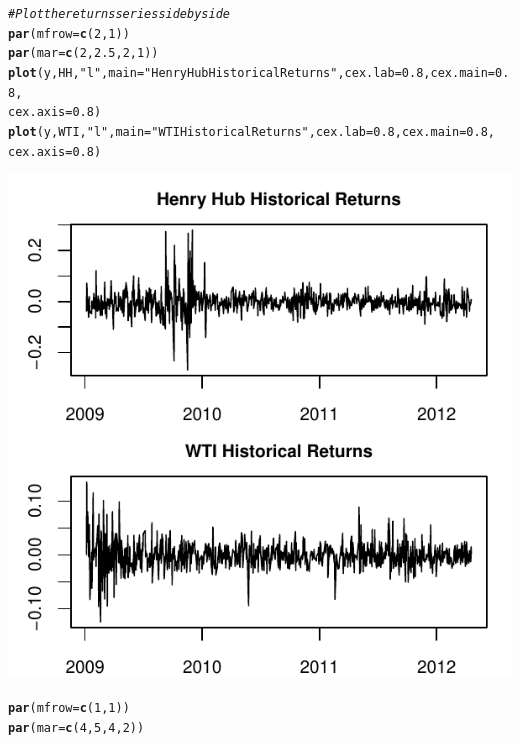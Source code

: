 \documentclass[10pt]{article}\usepackage[]{graphicx}\usepackage[]{color}
\makeatletter
\def\maxwidth{ %
  \ifdim\Gin@nat@width>\linewidth
    \linewidth
  \else
    \Gin@nat@width
  \fi
}
\newcommand{\hlnum}[1]{\textcolor[rgb]{0.686,0.059,0.569}{#1}}%
\newcommand{\hlstr}[1]{\textcolor[rgb]{0.192,0.494,0.8}{#1}}%
\newcommand{\hlcom}[1]{\textcolor[rgb]{0.678,0.584,0.686}{\textit{#1}}}%
\newcommand{\hlstd}[1]{\textcolor[rgb]{0.345,0.345,0.345}{#1}}%
\newcommand{\hlkwc}[1]{\textcolor[rgb]{0.333,0.667,0.333}{#1}}%
\newcommand{\hlkwd}[1]{\textcolor[rgb]{0.737,0.353,0.396}{\textbf{#1}}}%
\newenvironment{kframe}{%
 \def\at@end@of@kframe{}%
 \ifinner\ifhmode%
  \def\at@end@of@kframe{\end{minipage}}%
  \begin{minipage}{\columnwidth}%
 \fi\fi%
 \def\FrameCommand##1{\hskip\@totalleftmargin \hskip-\fboxsep
 \colorbox{shadecolor}{##1}\hskip-\fboxsep
     \hskip-\linewidth \hskip-\@totalleftmargin \hskip\columnwidth}%
 \MakeFramed {\advance\hsize-\width
   \@totalleftmargin\z@ \linewidth\hsize
   \@setminipage}}%
 {\par\unskip\endMakeFramed%
 \at@end@of@kframe}
\newenvironment{knitrout}{}{} %
\makeatother
\begin{document}
\begin{knitrout}
\color{fgcolor}\begin{kframe}
\begin{alltt}
\hlcom{# Plot the returns series side by side}
\hlkwd{par}\hlstd{(}\hlkwc{mfrow} \hlstd{=} \hlkwd{c}\hlstd{(}\hlnum{2}\hlstd{,} \hlnum{1}\hlstd{))}
\hlkwd{par}\hlstd{(}\hlkwc{mar} \hlstd{=} \hlkwd{c}\hlstd{(}\hlnum{2}\hlstd{,} \hlnum{2.5}\hlstd{,} \hlnum{2}\hlstd{,} \hlnum{1}\hlstd{))}
\hlkwd{plot}\hlstd{(y, HH,} \hlstr{"l"}\hlstd{,} \hlkwc{main} \hlstd{=} \hlstr{"Henry Hub Historical Returns"}\hlstd{,} \hlkwc{cex.lab} \hlstd{=} \hlnum{0.8}\hlstd{,} \hlkwc{cex.main} \hlstd{=} \hlnum{0.8}\hlstd{,}
    \hlkwc{cex.axis} \hlstd{=} \hlnum{0.8}\hlstd{)}
\hlkwd{plot}\hlstd{(y, WTI,} \hlstr{"l"}\hlstd{,} \hlkwc{main} \hlstd{=} \hlstr{"WTI Historical Returns"}\hlstd{,} \hlkwc{cex.lab} \hlstd{=} \hlnum{0.8}\hlstd{,} \hlkwc{cex.main} \hlstd{=} \hlnum{0.8}\hlstd{,}
    \hlkwc{cex.axis} \hlstd{=} \hlnum{0.8}\hlstd{)}
\end{alltt}
\end{kframe}

{\centering \includegraphics[width=\maxwidth]{figure/unnamed-chunk-12} 

}


\begin{kframe}\begin{alltt}
\hlkwd{par}\hlstd{(}\hlkwc{mfrow} \hlstd{=} \hlkwd{c}\hlstd{(}\hlnum{1}\hlstd{,} \hlnum{1}\hlstd{))}
\hlkwd{par}\hlstd{(}\hlkwc{mar} \hlstd{=} \hlkwd{c}\hlstd{(}\hlnum{4}\hlstd{,} \hlnum{5}\hlstd{,} \hlnum{4}\hlstd{,} \hlnum{2}\hlstd{))}
\end{alltt}
\end{kframe}
\end{knitrout}
\end{document}
